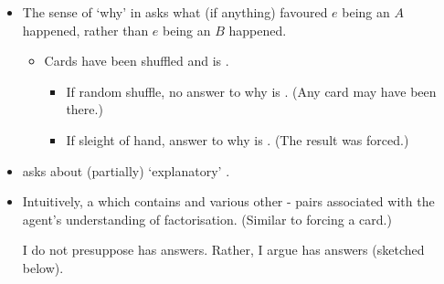 \documentclass[10pt]{article}
\newcommand{\hand}{\ding{43}}
\begin{document}
\begin{note}
  \begin{itemize}
  \item
    The sense of `why' in \qWhy{} asks what (if anything) favoured \(e\) being an \eiw{} \(A\) happened, rather than \(e\) being an \eiw{} \(B\) happened.
    \begin{itemize}
    \item
      Cards have been shuffled and \mainCard{} is \mainCardPos{}.
      \begin{itemize}
      \item
        If random shuffle, no answer to why \mainCard{} is \mainCardPos{}. \hfill (Any card may have been there.)
      \item
        If sleight of hand, answer to why \mainCard{} is \mainCardPos{}. \hfill (The result was forced.)
      \end{itemize}
    \end{itemize}
  \end{itemize}

  \begin{itemize}
  \item[\hand]
    \qWhy{} asks about (partially) `explanatory' .
  \item
    Intuitively,  \fof{} a \pool{} which contains  and various other - pairs associated with the agent's understanding of factorisation. (Similar to forcing a card.)\par

    I do not presuppose \qWhy{} has answers.
    Rather, I argue \qWhy{} has answers (sketched below).
  \end{itemize}
\end{note}

\begin{comment}
  Note, \qWhy{} asks about \emph{partial} explanations.
  So, these explanations need not be sufficient.
  And, \qWhy{} does not require the (partial) explanations are necessary.

  In this respect, you're allowed to lose some interest here.
  And, I think the permissiveness of explanation here is potentially an issue.
  That being said, I think some work could be done to add some interesting constraints here.
  The issue is incorporating these constraints into arguments.
  On the one hand, there's an issue of whether the relevant arguments can be made.
  And, on the other hand, there's an issue of complexity.
\end{comment}
\end{document}
